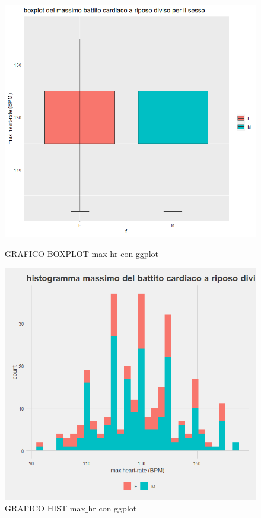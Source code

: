 \documentclass{article}
\begin{document}
\begin{figure}[!htb]
   \begin{minipage}{0.475\textwidth}
     \centering
     \includegraphics[width=1\linewidth]{rest_bp-boxpot after}
     \caption{GRAFICO BOXPLOT max$\_$hr con ggplot}
     \label{Fig:ds1}
   \end{minipage}\hfill
   \begin{minipage}{0.475\textwidth}
     \centering
     \includegraphics[width=1\linewidth]{rest_bp-hist after}
     \caption{GRAFICO HIST max$\_$hr con ggplot}
     \label{Fig:ds1}
   \end{minipage}
\end{figure}
\newpage
\end{document}
